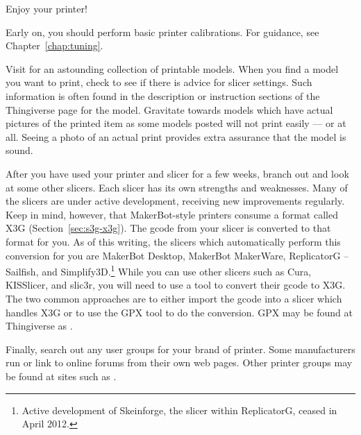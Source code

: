 Enjoy your printer!

Early on, you should perform basic printer calibrations.  For guidance, see Chapter~\ref{chap:tuning}.

Visit  for an astounding
collection of printable models.  When you find a model you want to
print, check to see if there is advice for slicer settings.  Such information
is often found in the description or instruction sections of the
Thingiverse page for the model.  Gravitate towards models which have
actual pictures of the printed item as some models posted will not print easily --- or at all.  Seeing a photo of an actual print provides extra assurance that the model is sound.

After you have used your printer and slicer for a few weeks, branch
out and look at some other slicers.  Each slicer has
its own strengths and weaknesses.  Many of the slicers are under
active development, receiving new improvements regularly.  Keep in
mind, however, that MakerBot-style printers consume a format called
X3G (Section~\ref{sec:s3g-x3g}).  The gcode from your slicer is
converted to that format for you.  As of this writing, the slicers
which automatically perform this conversion for you are MakerBot
Desktop, MakerBot MakerWare, ReplicatorG -- Sailfish, and
Simplify3D.\footnote{Active development of Skeinforge, the slicer within
ReplicatorG, ceased in April 2012.}
While you can use other slicers such as Cura, KISSlicer, and slic3r,
you will need to use a tool to convert their gcode to X3G.  The
two common approaches are to either import the gcode into a slicer which
handles X3G or to use the \gls{GPX} tool to do the conversion.  GPX may be
found at Thingiverse as
.

Finally, search out any user groups for your brand of printer.  Some
manufacturers run or link to online forums from their own web pages.
Other printer groups may be found at sites such as
.
